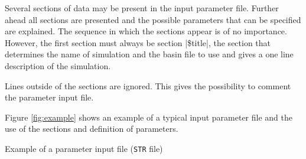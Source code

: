 Several sections of data may be present in the input parameter file.
Further ahead all sections are presented and the possible
parameters that can be specified are explained. The sequence in
which the sections appear is of no importance. However, the first 
section must always be section |\$title|, the section that
determines the name of simulation and the basin file to use and
gives a one line description of the simulation.

Lines outside of the sections are ignored. This gives
the possibility to comment the parameter input file.

Figure \ref{fig:example} shows an example of a typical input
parameter file and the use of the sections and definition of
parameters.

{Example of a parameter input file ({\tt STR} file)}

